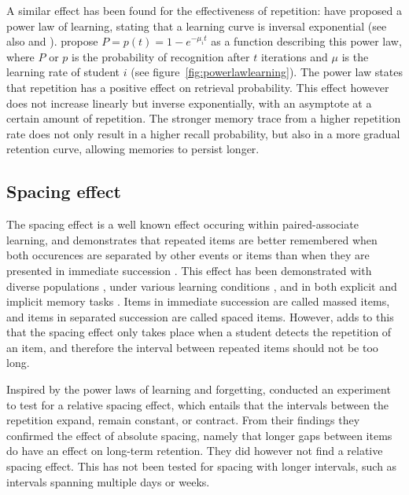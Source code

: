 A similar effect has been found for the effectiveness of repetition:  have proposed a power law of learning, stating that a learning curve is inversal exponential (see also  and ).  propose $P = p(t) = 1-e^{-\mu_{i}t}$ as a function describing this power law, where $P$ or $p$ is the probability of recognition after $t$ iterations and $\mu$ is the learning rate of student $i$ (see figure~\ref{fig:powerlawlearning}). The power law states that repetition has a positive effect on retrieval probability. This effect however does not increase linearly but inverse exponentially, with an asymptote at a certain amount of repetition. The stronger memory trace from a higher repetition rate does not only result in a higher recall probability, but also in a more gradual retention curve, allowing memories to persist longer.

\subsection{Spacing effect}
\label{subsec:spacingeffect}

The spacing effect is a well known effect occuring within paired-associate learning, and demonstrates that repeated items are better remembered when both occurences are separated by other events or items than when they are presented in immediate succession \cite{verkoeijen, logan, siegel, xue, karpicke2}. This effect has been demonstrated with diverse populations \cite{verkoeijen, logan}, under various learning conditions \cite{verkoeijen, logan}, and in both explicit and implicit memory tasks \cite{verkoeijen}. Items in immediate succession are called massed items, and items in separated succession are called spaced items. However,  adds to this that the spacing effect only takes place when a student detects the repetition of an item, and therefore the interval between repeated items should not be too long.

Inspired by the power laws of learning and forgetting,  conducted an experiment to test for a relative spacing effect, which entails that the intervals between the repetition expand, remain constant, or contract. From their findings they confirmed the effect of absolute spacing, namely that longer gaps between items do have an effect on long-term retention. They did however not find a relative spacing effect. This has not been tested for spacing with longer intervals, such as intervals spanning multiple days or weeks.

